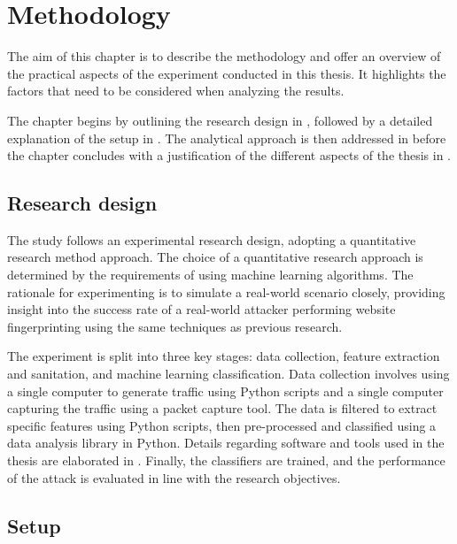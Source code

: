 \chapter{Methodology\label{ch:methodology}}

The aim of this chapter is to describe the methodology and offer an overview of the practical aspects of the experiment conducted in this thesis. It highlights the factors that need to be considered when analyzing the results.

The chapter begins by outlining the research design in , followed by a detailed explanation of the setup in . The analytical approach is then addressed in  before the chapter concludes with a justification of the different aspects of the thesis in .

\afterpage{\cfoot{\thepage}}

\clearpage


\section{Research design\label{sec:design-methodology}}

The study follows an experimental research design, adopting a quantitative research method approach. The choice of a quantitative research approach is determined by the requirements of using machine learning algorithms. The rationale for experimenting is to simulate a real-world scenario closely, providing insight into the success rate of a real-world attacker performing website fingerprinting using the same techniques as previous research. 

The experiment is split into three key stages: data collection, feature extraction and sanitation, and machine learning classification. Data collection involves using a single computer to generate traffic using Python scripts and a single computer capturing the traffic using a packet capture tool. The data is filtered to extract specific features using Python scripts, then pre-processed and classified using a data analysis library in Python. Details regarding software and tools used in the thesis are elaborated in . Finally, the classifiers are trained, and the performance of the attack is evaluated in line with the research objectives.

\section{Setup\label{sec:setup-methodology}}

